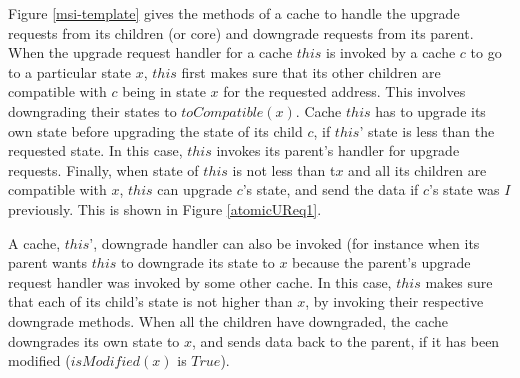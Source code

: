 Figure \ref{msi-template} gives the methods of a cache to handle the upgrade
requests from its children (or core) and downgrade requests from its parent.
When the upgrade request handler \uReq{} for a cache $this$ is invoked by a
cache $c$ to go to a particular state $x$, $this$ first makes sure that its
other children are compatible with $c$ being in state $x$ for the requested
address. This involves downgrading their states to $toCompatible(x)$. Cache
$this$ has to upgrade its own state before upgrading the state of its child $c$,
if $this$' state is less than the requested state. In this case, $this$ invokes
its parent's handler for upgrade requests. Finally, when state of $this$ is not
less than t$x$ and all its children are compatible with $x$, $this$ can upgrade
$c$'s state, and send the data if $c$'s state was $I$ previously. This is shown
in Figure \ref{atomicUReq1}.

A cache, $this$', downgrade handler \dReq{} can also be invoked (for instance
when its parent wants $this$ to downgrade its state to $x$ because the parent's
upgrade request handler was invoked by some other cache. In this case, $this$
makes sure that each of its child's state is not higher than $x$, by invoking
their respective downgrade methods. When all the children have downgraded, the
cache downgrades its own state to $x$, and sends data back to the parent, if it
has been modified (\ie $isModified(x)$ is $True$).

